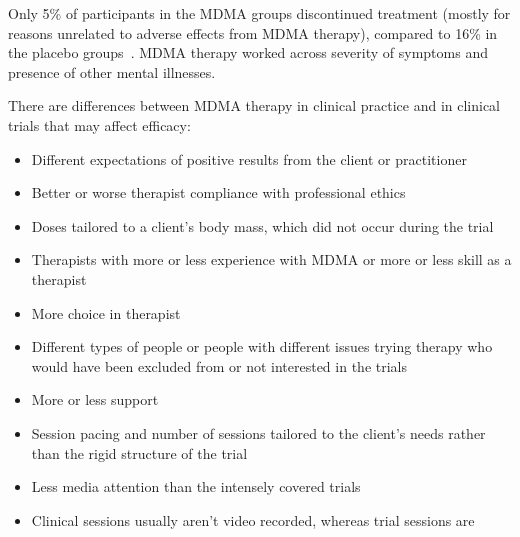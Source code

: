 \documentclass[11pt,oneside]{book}
\let\cite\parencite
\begin{document}
Only 5\% of participants in the MDMA groups discontinued treatment (mostly for reasons unrelated to adverse effects from MDMA therapy), compared to 16\% in the placebo groups~\cite{mitchellMDMAClinicalTrial,mitchellMDMAClinicalTrial2}. MDMA therapy worked across severity of symptoms and presence of other mental illnesses.

There are differences between MDMA therapy in clinical practice and in clinical trials that may affect efficacy:
\begin{itemize}
    \item Different expectations of positive results from the client or practitioner
    \item Better or worse therapist compliance with professional ethics
    \item Doses tailored to a client's body mass, which did not occur during the trial~\cite{mitchellMDMAClinicalTrial,mitchellMDMAClinicalTrial2}
    \item Therapists with more or less experience with MDMA or more or less skill as a therapist
    \item More choice in therapist
    \item Different types of people or people with different issues trying therapy who would have been excluded from or not interested in the trials
    \item More or less support
    \item Session pacing and number of sessions tailored to the client's needs rather than the rigid structure of the trial
    \item Less media attention than the intensely covered trials
    \item Clinical sessions usually aren't video recorded, whereas trial sessions are
\end{itemize}
\end{document}
